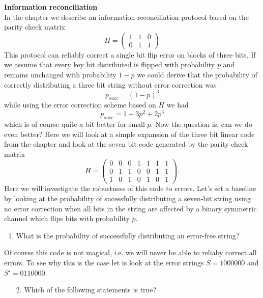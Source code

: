 \begin{exercises}
\item {\bf Information reconciliation}\\
In the chapter we describe an information reconciliation protocol based on the parity check matrix\[H = \begin{pmatrix} 1 & 1 & 0\\ 0 & 1 & 1 \end{pmatrix}\] This protocol can reliably correct a single bit flip error on blocks of three bits. If we assume that every key bit distributed is flipped with probability \(p\) and remains unchanged with probability \(1-p\) we could derive that the probability of correctly distributing a three bit string without error correction was
\[p_{succ} = (1-p)^3\]
while using the error correction scheme based on \(H\) we had   \[p_{succ} = 1-3p^2 + 2p^3\]
which is of course quite a bit better for small \(p\). Now the question is, can we do even better? Here we will look at a simple expansion of the three bit linear code from the chapter and look at the seven bit code generated by the parity check matrix
\[ H = \begin{pmatrix} 0 & 0 & 0 & 1 & 1 & 1 & 1 \\ 0 & 1 & 1 & 0 & 0 & 1 & 1\\ 1 & 0 & 1 & 0 & 1 & 0 & 1 \end{pmatrix}. \] Here we will investigate the robustness of this code to errors. Let's set a baseline by looking at the probability of sucessfully distributing a seven-bit string using no error correction when all bits in the string are affected by a binary symmetric channel which flips bits with probability \(p\).
\begin{enumerate}
\item What is the probability of successfully distributing an error-free string?
\end{enumerate}
Of course this code is not magical, i.e. we will never be able to reliaby correct all errors. To see why this is the case let is look at the error strings \(S = 1000000\) and \(S' = 0110000\).
\begin{enumerate}
\item[2.] Which of the following statements is true?
\end{enumerate}
\end{exercises}
